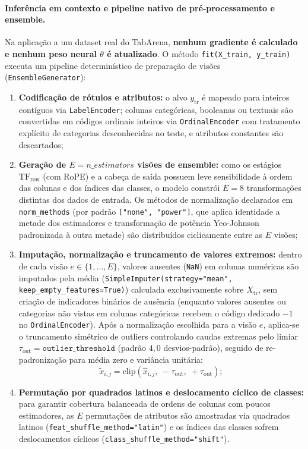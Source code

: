 \documentclass[11pt,a4paper]{article}
\begin{document}
\paragraph{Inferência em contexto e pipeline nativo de pré-processamento e ensemble.}
Na aplicação a um dataset real do TabArena, \textbf{nenhum gradiente é calculado e nenhum peso neural $\theta$ é atualizado}. O método \texttt{fit(X\_train, y\_train)} executa um pipeline determinístico de preparação de visões (\texttt{EnsembleGenerator}):
\begin{enumerate}[leftmargin=2em]
    \item \textbf{Codificação de rótulos e atributos:} o alvo $y_{\mathrm{tr}}$ é mapeado para inteiros contíguos via \texttt{LabelEncoder}; colunas categóricas, booleanas ou textuais são convertidas em códigos ordinais inteiros via \texttt{OrdinalEncoder} com tratamento explícito de categorias desconhecidas no teste, e atributos constantes são descartados;
    \item \textbf{Geração de $E = n\_estimators$ visões de ensemble:} como os estágios $\mathrm{TF}_{\mathrm{row}}$ (com RoPE) e a cabeça de saída possuem leve sensibilidade à ordem das colunas e dos índices das classes, o modelo constrói $E = 8$ transformações distintas dos dados de entrada. Os métodos de normalização declarados em \texttt{norm\_methods} (por padrão \texttt{["none", "power"]}, que aplica identidade a metade dos estimadores e transformação de potência Yeo-Johnson padronizada à outra metade) são distribuídos ciclicamente entre as $E$ visões;
    \item \textbf{Imputação, normalização e truncamento de valores extremos:} dentro de cada visão $e \in \{1, \dots, E\}$, valores ausentes (\texttt{NaN}) em colunas numéricas são imputados pela média (\texttt{SimpleImputer(strategy="mean", keep\_empty\_features=True)}) calculada exclusivamente sobre $X_{\mathrm{tr}}$, sem criação de indicadores binários de ausência (enquanto valores ausentes ou categorias não vistas em colunas categóricas recebem o código dedicado $-1$ no \texttt{OrdinalEncoder}). Após a normalização escolhida para a visão $e$, aplica-se o truncamento simétrico de outliers controlando caudas extremas pelo limiar $\tau_{\mathrm{out}} = \texttt{outlier\_threshold}$ (padrão $4{,}0$ desvios-padrão), seguido de re-padronização para média zero e variância unitária:
    \begin{equation}
        \tilde{x}_{i,j} = \mathrm{clip}\!\left(\hat{x}_{i,j}, \; -\tau_{\mathrm{out}}, \; +\tau_{\mathrm{out}}\right);
        \label{eq:outlier_clip}
    \end{equation}
    \item \textbf{Permutação por quadrados latinos e deslocamento cíclico de classes:} para garantir cobertura balanceada de ordens de colunas com poucos estimadores, as $E$ permutações de atributos são amostradas via quadrados latinos (\texttt{feat\_shuffle\_method="latin"}) e os índices das classes sofrem deslocamentos cíclicos (\texttt{class\_shuffle\_method="shift"}).
\end{enumerate}
\end{document}
